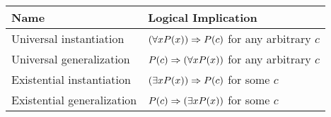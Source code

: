 \begin{theorem} \quad\par
    \begin{center}
        \begin{tabular}{ll}
            \textbf{Name} & \textbf{Logical Implication} \\
            \hline
            Universal instantiation & $(\forall x P(x)) \Rightarrow P(c)$ for any arbitrary $c$ \\
            Universal generalization & $P(c) \Rightarrow (\forall x P(x))$ for any arbitrary $c$ \\
            Existential instantiation & $(\exists x P(x)) \Rightarrow P(c)$ for some $c$ \\
            Existential generalization & $P(c) \Rightarrow (\exists x P(x))$ for some $c$ \\
        \end{tabular}
    \end{center}
    
\end{theorem}